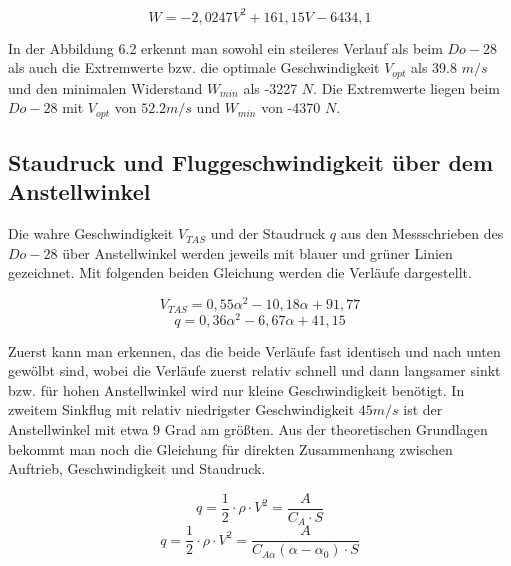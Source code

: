 \begin{equation*}
W = -2,0247 {V}^{2} + 161,15 V - 6434,1
\end{equation*}

In der Abbildung 6.2 erkennt man sowohl ein steileres Verlauf als beim $Do -28$ als auch die Extremwerte bzw. die optimale Geschwindigkeit $V_{opt}$ als 39.8 $m/s$ und den minimalen Widerstand $W_{min}$ als -3227 $N$. Die Extremwerte liegen beim $Do -28$ mit $V_{opt}$ von $52.2 m/s$ und $W_{min}$ von -4370 $N$.

\subsection{Staudruck und Fluggeschwindigkeit über dem Anstellwinkel}
Die wahre Geschwindigkeit $V_{TAS}$ und der Staudruck $q$ aus den Messschrieben des $Do -28$ über Anstellwinkel werden jeweils mit blauer und grüner Linien gezeichnet. Mit folgenden beiden Gleichung werden die Verläufe dargestellt.

\begin{equation*}
V_{TAS} = 0,55\alpha^2 - 10,18 \alpha + 91,77
\end{equation*}
\begin{equation*}
q = 0,36 \alpha^2 - 6,67 \alpha + 41,15
\end{equation*}

Zuerst kann man erkennen, das die beide Verläufe fast identisch und nach unten gewölbt sind, wobei die Verläufe zuerst relativ schnell und dann langsamer sinkt bzw. für hohen Anstellwinkel wird nur kleine Geschwindigkeit benötigt. In zweitem Sinkflug mit relativ niedrigster Geschwindigkeit $45 m/s$ ist der Anstellwinkel mit etwa 9 Grad am größten.
Aus der theoretischen Grundlagen bekommt man noch die Gleichung für direkten Zusammenhang zwischen Auftrieb, Geschwindigkeit und Staudruck.

\begin{equation}
q = \frac{1}{2} \cdot \rho \cdot {V}^{2} = \frac{A}{C_A \cdot S}
\end{equation}
\begin{equation*}
q = \frac{1}{2} \cdot \rho \cdot {V}^{2} = \frac{A}{C_{A\alpha}(\alpha-\alpha_0) \cdot S}
\end{equation*}

\newpage
	

